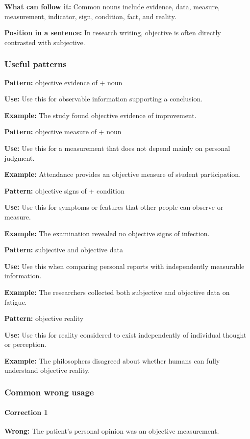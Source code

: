 \documentclass[11pt]{article}
\begin{document}
\textbf{What can follow it:} Common nouns include evidence, data, measure, measurement, indicator, sign, condition, fact, and reality.

\textbf{Position in a sentence:} In research writing, objective is often directly contrasted with subjective.

\subsubsection{Useful patterns}
\textbf{Pattern:} objective evidence of + noun

\textbf{Use:} Use this for observable information supporting a conclusion.

\textbf{Example:} The study found objective evidence of improvement.

\textbf{Pattern:} objective measure of + noun

\textbf{Use:} Use this for a measurement that does not depend mainly on personal judgment.

\textbf{Example:} Attendance provides an objective measure of student participation.

\textbf{Pattern:} objective signs of + condition

\textbf{Use:} Use this for symptoms or features that other people can observe or measure.

\textbf{Example:} The examination revealed no objective signs of infection.

\textbf{Pattern:} subjective and objective data

\textbf{Use:} Use this when comparing personal reports with independently measurable information.

\textbf{Example:} The researchers collected both subjective and objective data on fatigue.

\textbf{Pattern:} objective reality

\textbf{Use:} Use this for reality considered to exist independently of individual thought or perception.

\textbf{Example:} The philosophers disagreed about whether humans can fully understand objective reality.

\subsubsection{Common wrong usage}
\paragraph{Correction 1}
\textbf{Wrong:} The patient's personal opinion was an objective measurement.
\end{document}
